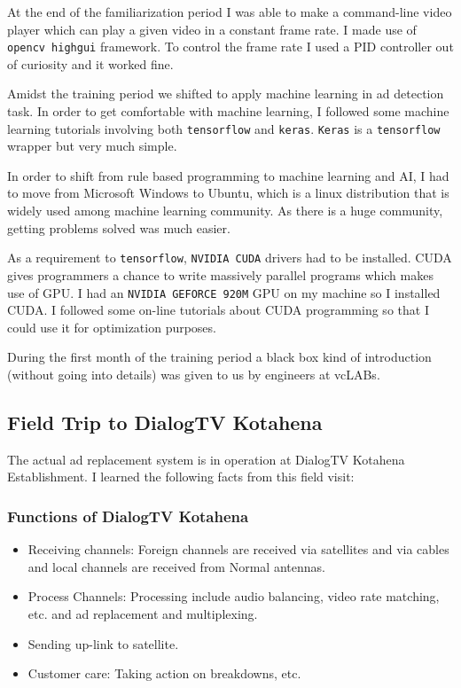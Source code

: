 At the end of the familiarization period I was able to make a command-line video player which can play a given video in a constant frame rate. I made use of \texttt{opencv highgui} framework. To control the frame rate I used a PID controller out of curiosity and it worked fine.

Amidst the training period we shifted to apply machine learning in ad detection task. In order to get comfortable with machine learning, I followed some machine learning tutorials involving both \texttt{tensorflow} and \texttt{keras}. \texttt{Keras} is a \texttt{tensorflow} wrapper but very much simple.

In order to shift from rule based programming to machine learning and AI, I had to move from Microsoft Windows to Ubuntu, which is a linux distribution that is widely used among machine learning community. As there is a huge community, getting problems solved was much easier.

As a requirement to \texttt{tensorflow}, \texttt{NVIDIA CUDA} drivers had to be installed. CUDA gives programmers a chance to write massively parallel programs which makes use of GPU. I had an \texttt{NVIDIA GEFORCE 920M} GPU on my machine so I installed CUDA. I followed some on-line tutorials about CUDA programming so that I could use it for optimization purposes.

During the first month of the training period a black box kind of introduction (without going into details) was given to us by engineers at vcLABs.

\subsection{Field Trip to DialogTV Kotahena}
The actual ad replacement system is in operation at DialogTV Kotahena Establishment. I learned the following facts from this field visit:

\subsubsection{Functions of DialogTV Kotahena}

\begin{itemize}
\item Receiving channels: Foreign channels are received via satellites and via cables and local channels are received from Normal antennas.
\item Process Channels: Processing include audio balancing, video rate matching, etc. and ad replacement and multiplexing.
\item Sending up-link to satellite.
\item Customer care: Taking action on breakdowns, etc. 
\end{itemize}

